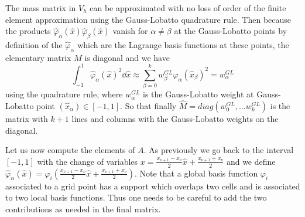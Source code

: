  
The mass matrix in $V_h$ can be approximated with no loss of order of the finite element approximation using the Gauss-Lobatto
 quadrature rule. Then because the products $ \hat{\varphi}_\alpha(\hat{x})\hat{\varphi}_\beta(\hat{x})$ vanish for $\alpha\neq \beta$ at the Gauss-Lobatto points by definition of the $\hat{\varphi}_\alpha$
which are the Lagrange  basis functions at these points, the elementary matrix $M$
is diagonal and we have
$$\int_{-1}^1  \hat{\varphi}_\alpha(\hat{x})^2\dd \hat{x}\approx \sum_{\beta=0}^k w^{GL}_\beta \varphi_\alpha(\hat{x}_\beta)^2=w^{GL}_\alpha$$
 using the quadrature rule, where $w^{GL}_\alpha$ is the Gauss-Lobatto weight at Gauss-Lobatto point $(\hat{x}_\alpha)\in [-1,1]$. So that finally $\hat{M}=diag(w^{GL}_0,\dots w^{GL}_k)$ is the matrix with $k+1$ lines and columns with the Gauss-Lobatto weights on the diagonal.
 
 
Let us now compute the elements of $A$. As previously we go back to the interval $[-1,1]$ with the change of variables   $x=\frac{x_{\nu+1}-x_\nu}{2}\hat{x} + \frac{x_{\nu+1}+x_\nu}{2}$ and we define $ \hat{\varphi}_\alpha(\hat{x}) = \varphi_i(\frac{x_{\nu+1}-x_\nu}{2}\hat{x} +\frac{x_{\nu+1}+x_\nu}{2})$. Note  that a global basis function $\varphi_i$ associated to a grid point has a support which overlaps two cells and is associated to two local basis functions. Thus one needs to be careful to add the two contributions as needed in the final matrix. 




